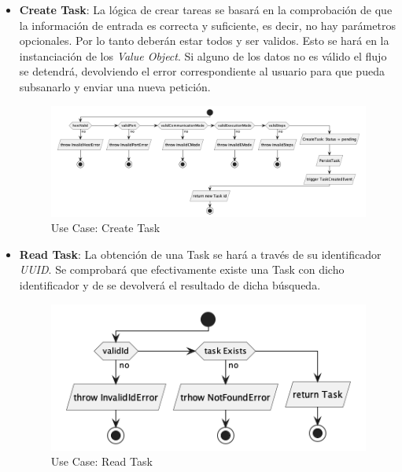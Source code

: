 \begin{itemize}
    \item  \textbf{Create Task}: La lógica de crear tareas se basará en la comprobación de que la información de entrada es correcta y suficiente, es decir, no hay parámetros opcionales.
    Por lo tanto deberán estar todos y ser validos.
    Esto se hará en la instanciación de los \textit{Value Object}.
    Si alguno de los datos no es válido el flujo se detendrá, devolviendo el error correspondiente al usuario para que pueda subsanarlo y enviar una nueva petición.

    \begin{figure}[H]
        \centering
        \includegraphics[height=0.2\textheight]{./part/Proyecto_ejecutivo/memoria_descriptiva/descripcionDelProyecto/manager/uml/createTaskUseCase}
        \caption{Use Case: Create Task}\label{fig:Use Case-Create Task}
    \end{figure}

    \item \textbf{Read Task}: La obtención de una Task se hará a través de su identificador \textit{UUID}.
    Se comprobará que efectivamente existe una Task con dicho identificador y de se devolverá el resultado de dicha búsqueda.

    \begin{figure}[H]
        \centering
        \includegraphics[height=0.15\textheight]{./part/Proyecto_ejecutivo/memoria_descriptiva/descripcionDelProyecto/manager/uml/getTaskUseCase}
        \caption{Use Case: Read Task}\label{fig:Use Case-Read Task}
    \end{figure}


\end{itemize}
